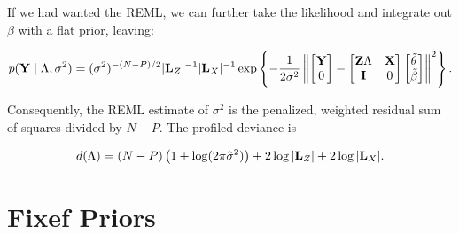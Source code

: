 \documentclass[10pt]{article}
\begin{document}
If we had wanted the REML, we can further take the likelihood and
integrate out $\beta$ with a flat prior, leaving:

\begin{equation*}
p({\bf Y} \mid \Lambda, \sigma^2) = (\sigma^2)^{-(N - P) / 2} |{\bf
  L}_Z|^{-1} |{\bf L}_X|^{-1}\exp\left\{-\frac{1}{2\sigma^2}
\left\|
\begin{bmatrix} {\bf Y} \\ 0 \end{bmatrix}
-\begin{bmatrix}{\bf Z}\Lambda & {\bf X} \\ {\bf I} & 0 \end{bmatrix}
\begin{bmatrix}\tilde\theta \\ \tilde\beta\end{bmatrix}
\right\|^2
\right\}.
\end{equation*}

Consequently, the REML estimate of $\sigma^2$ is the penalized,
weighted residual sum of squares divided by $N - P$. The profiled
deviance is

\begin{equation*}
d(\Lambda) = (N - P)\left(1 + \log(2\pi\hat\sigma^2)\right)+2\log|{\bf
  L}_Z| + 2\log|{\bf L}_X|.
\end{equation*}

\newpage

\section*{Fixef Priors}
\end{document}
